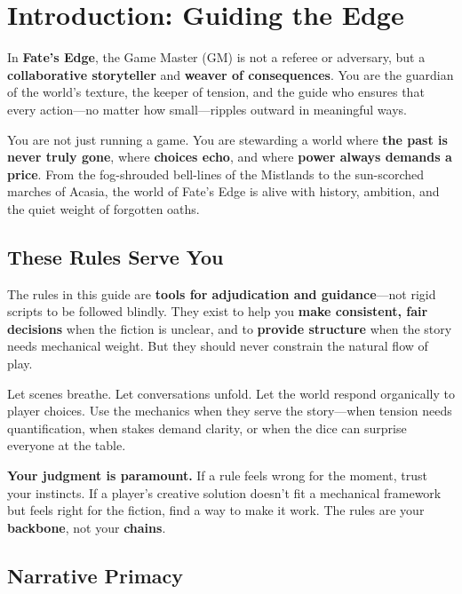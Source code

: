 \chapter{Introduction: Guiding the Edge}

In \textbf{Fate's Edge}, the Game Master (GM) is not a referee or adversary, but a \textbf{collaborative storyteller} and \textbf{weaver of consequences}. You are the guardian of the world's texture, the keeper of tension, and the guide who ensures that every action---no matter how small---ripples outward in meaningful ways.

You are not just running a game. You are stewarding a world where \textbf{the past is never truly gone}, where \textbf{choices echo}, and where \textbf{power always demands a price}. From the fog-shrouded bell-lines of the Mistlands to the sun-scorched marches of Acasia, the world of Fate's Edge is alive with history, ambition, and the quiet weight of forgotten oaths.

\section*{These Rules Serve You}

The rules in this guide are \textbf{tools for adjudication and guidance}---not rigid scripts to be followed blindly. They exist to help you \textbf{make consistent, fair decisions} when the fiction is unclear, and to \textbf{provide structure} when the story needs mechanical weight. But they should never constrain the natural flow of play.

Let scenes breathe. Let conversations unfold. Let the world respond organically to player choices. Use the mechanics when they serve the story---when tension needs quantification, when stakes demand clarity, or when the dice can surprise everyone at the table.

\textbf{Your judgment is paramount.} If a rule feels wrong for the moment, trust your instincts. If a player's creative solution doesn't fit a mechanical framework but feels right for the fiction, find a way to make it work. The rules are your \textbf{backbone}, not your \textbf{chains}.

\section*{Narrative Primacy}

